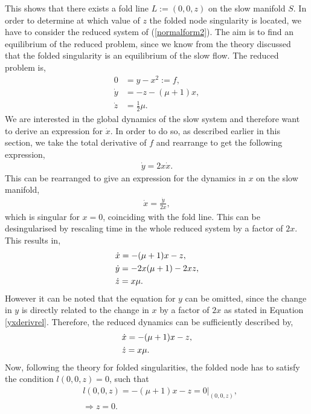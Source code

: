This shows that there exists a fold line $L:=(0,0,z)$ on the slow manifold $S$.
In order to determine at which value of $z$ the folded node singularity is located, we have to consider the reduced system of (\ref{normalform2}). The aim is to find an equilibrium of the reduced problem, since we know from the theory discussed that the folded singularity is an equilibrium of the slow flow.
The reduced problem is,
\begin{align}\label{normalform2red}
0 &= y - x^2 :=f,\\
\dot{y} &=- z -(\mu +1)x, \\
\dot{z} &=\frac{1}{2} \mu.
\end{align}
We are interested in the global dynamics of the slow system and therefore want to derive an expression for $\dot{x}$. In order to do so, as described earlier in this section, we take the total derivative of $f$ and rearrange to get the following expression,
\begin{align} \label{yxderivrel}
\dot{y} = 2x \dot{x}.
\end{align}
 This can be rearranged to give an expression for the dynamics in $x$ on the slow manifold,
\begin{align*}
\dot{x}= \frac{\dot{y}}{2x},
\end{align*}
which is singular for $x=0$, coinciding with the fold line.
This can be desingularised by rescaling time in the whole reduced system by a factor of $2x$. This results in,
\begin{align} \label{fullredsysformmo}
&\dot{x} = -(\mu+1)x - z, \notag \\
&\dot{y} = - 2x (\mu +1) -2xz,\\
&\dot{z} = x \mu \notag.
\end{align}
However it can be noted that the equation for $y$ can be omitted, since the change in $y$ is directly related to the change in $x$ by a factor of $2x$ as stated in Equation \ref{yxderivrel}. Therefore, the reduced dynamics can be sufficiently described by,
\begin{align}\label{twovarxzred}
&\dot{x} = -(\mu+1)x - z,\\
&\dot{z} = x \mu. \notag
\end{align}
Now, following the theory for folded singularities, the folded node has to satisfy the condition $l(0,0,z)=0$, such that
\begin{align*}
&l(0,0,z)= -(\mu+1)x - z=0 |_{(0,0,z)},\\
&\Rightarrow z=0.
\end{align*}
